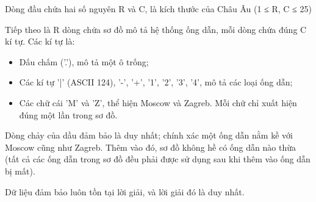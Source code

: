 Dòng đầu chứa hai số nguyên R và C, là kích thước của Châu Âu (1 ≤ R, C ≤ 25)  

   Tiếp theo là R dòng chứa sơ đồ mô tả hệ thống ống dẫn, mỗi dòng chứa đúng C kí tự. Các kí tự là:  
\begin{itemize}
	\item     Dấu chấm ('.'), mô tả một ô trống;   
	\item     Các kí tự '|' (ASCII 124), '-', '+', '1', '2', '3', '4', mô tả các loại ống dẫn;   
	\item     Các chữ cái 'M' và 'Z', thể hiện Moscow và Zagreb. Mỗi chữ chỉ xuất hiện đúng một lần trong sơ đồ.   
\end{itemize}

   Dòng chảy của dầu đảm bảo là duy nhất; chính xác một ống dẫn nằm kề với Moscow cũng như Zagreb. Thêm vào đó, sơ đồ không hề có ống dẫn nào thừa (tất cả các ống dẫn trong sơ đồ đều phải được sử dụng sau khi thêm vào ống dẫn bị mất).  

   Dữ liệu đảm bảo luôn tồn tại lời giải, và lời giải đó là duy nhất.  

\